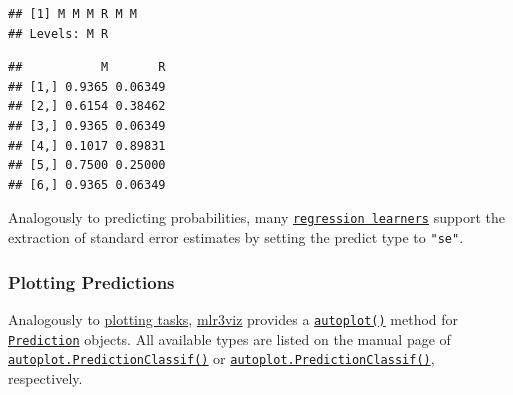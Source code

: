 \documentclass[]{article}
\newenvironment{Shaded}{\begin{snugshade}}{\end{snugshade}}
\newcommand{\CommentTok}[1]{\textcolor[rgb]{0.56,0.35,0.01}{\textit{#1}}}
\newcommand{\DataTypeTok}[1]{\textcolor[rgb]{0.13,0.29,0.53}{#1}}
\newcommand{\KeywordTok}[1]{\textcolor[rgb]{0.13,0.29,0.53}{\textbf{#1}}}
\newcommand{\NormalTok}[1]{#1}
\newcommand{\OperatorTok}[1]{\textcolor[rgb]{0.81,0.36,0.00}{\textbf{#1}}}
\newcommand{\StringTok}[1]{\textcolor[rgb]{0.31,0.60,0.02}{#1}}
\renewenvironment{Shaded} {\begin{snugshade}\small} {\end{snugshade}}
\begin{document}
\begin{verbatim}
## [1] M M M R M M
## Levels: M R
\end{verbatim}

\begin{Shaded}
\end{Shaded}

\begin{verbatim}
##           M       R
## [1,] 0.9365 0.06349
## [2,] 0.6154 0.38462
## [3,] 0.9365 0.06349
## [4,] 0.1017 0.89831
## [5,] 0.7500 0.25000
## [6,] 0.9365 0.06349
\end{verbatim}

Analogously to predicting probabilities, many \href{https://mlr3.mlr-org.com/reference/LearnerRegr.html}{\texttt{regression\ learners}} support the extraction of standard error estimates by setting the predict type to \texttt{"se"}.

\hypertarget{autoplot-prediction}{%
\subsubsection{Plotting Predictions}\label{autoplot-prediction}}

Analogously to \protect\hyperlink{autoplot-task}{plotting tasks}, \href{https://mlr3viz.mlr-org.com}{mlr3viz} provides a \href{https://www.rdocumentation.org/packages/ggplot2/topics/autoplot}{\texttt{autoplot()}} method for \href{https://mlr3.mlr-org.com/reference/Prediction.html}{\texttt{Prediction}} objects.
All available types are listed on the manual page of \href{https://mlr3viz.mlr-org.com/reference/autoplot.PredictionClassif.html}{\texttt{autoplot.PredictionClassif()}} or \href{https://mlr3viz.mlr-org.com/reference/autoplot.PredictionClassif.html}{\texttt{autoplot.PredictionClassif()}}, respectively.

\begin{Shaded}
\end{Shaded}
\end{document}
